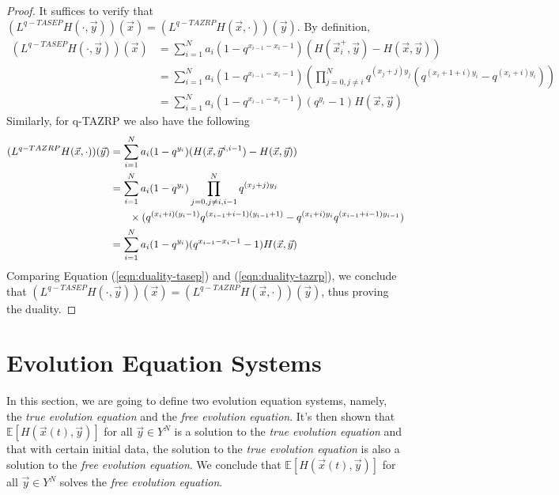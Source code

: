 \begin{proof}
It suffices to verify that $(L^{q-TASEP} H(\cdot , \vec{y}))(\vec{x}) = (L^{q-TAZRP} H(\vec{x}, \cdot))(\vec{y})$. By definition,
\begin{align}
(L^{q-TASEP} H(\cdot , \vec{y}))(\vec{x}) &= \sum_{i=1}^{N} a_i (1-q^{x_{i-1} - x_i - 1}) (H(\vec{x}_i^+,\vec{y}) - H(\vec{x},\vec{y}))\\
																				&= \sum_{i=1}^{N} a_i (1-q^{x_{i-1} - x_i - 1}) (\prod_{j=0,j \neq i}^{N} q^{(x_j+j)y_j} (q^{(x_i+1+i)y_i} - q^{(x_i + i)y_i}))\\
																				&= \sum_{i=1}^{N} a_i (1-q^{x_{i-1} - x_i - 1})(q^{y_i} - 1) H(\vec{x},\vec{y}) \label{eqn:duality-tasep}
\end{align}
Similarly, for q-TAZRP we also have the following
\begin{align}
(L^{q-TAZRP} H(\vec{x}, \cdot))(\vec{y}) &= \sum_{i=1}^{N} a_i (1-q^{y_i}) (H(\vec{x},\vec{y}^{i,i-1}) - H(\vec{x},\vec{y}))\\
																				&= \sum_{i=1}^{N} a_i (1-q^{y_i})\prod_{j=0,j \neq i, i-1}^{N} q^{(x_j+j)y_j} \notag \\
																				&\hphantom{{} = 1} \times (q^{(x_i+i)(y_i-1)} q^{(x_{i-1}+i-1)(y_{i-1}+1)} - q^{(x_i + i)y_i} q^{(x_{i-1} + i-1)y_{i-1}}) \\
																				&= \sum_{i=1}^{N} a_i (1-q^{y_i}) (q^{x_{i-1} - x_i - 1} - 1) H(\vec{x},\vec{y}) \label{eqn:duality-tazrp}
\end{align}
Comparing Equation (\ref{eqn:duality-tasep}) and (\ref{eqn:duality-tazrp}), we conclude that $(L^{q-TASEP} H(\cdot , \vec{y}))(\vec{x}) = (L^{q-TAZRP} H(\vec{x}, \cdot))(\vec{y})$, thus proving the duality.
\end{proof}
\section{Evolution Equation Systems}
In this section, we are going to define two evolution equation systems, namely, the \emph{true evolution equation} and the \emph{free evolution equation}. It's then shown that $\mathbb{E}[H(\vec{x}(t),\vec{y})]$ for all $\vec{y} \in Y^N$ is a solution to the \emph{true evolution equation} and that with certain initial data, the solution to the \emph{true evolution equation} is also a solution to the \emph{free evolution equation}. We conclude that $\mathbb{E}[H(\vec{x}(t),\vec{y})]$ for all $\vec{y} \in Y^N$ solves the \emph{free evolution equation}.

